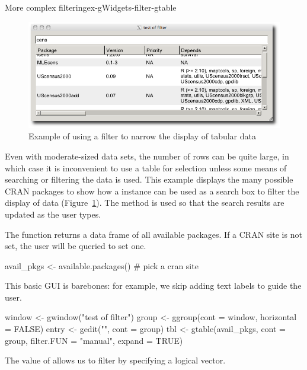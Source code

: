 \begin{example}{More complex filtering}{ex-gWidgets-filter-gtable}
%
\begin{figure}
  \centering
  \includegraphics[width=.8\textwidth]{fig-gWidgets-filter-example}
  \caption{Example of using a filter to narrow the display of tabular data}
  \label{fig:gWidgets-filter-example}
\end{figure}
%
Even with moderate-sized data sets, the number of rows can be quite large, in which case it is
inconvenient to use a table for selection unless some means of searching or filtering the
data is used. This example displays the many possible CRAN packages to show how a
 instance can be used as a search box to filter the display of
data (Figure~\ref{fig:gWidgets-filter-example}). The  method is used so that the search
results are updated as the user types.


The  function returns a data frame of all
available packages. If a CRAN site is not set, the user will be
queried to set one.
\begin{Schunk}
\begin{Sinput}
 avail_pkgs <- available.packages()       # pick a cran site
\end{Sinput}
\end{Schunk}

This basic GUI is barebones: for example, we skip adding text labels to guide the user. 
\begin{Schunk}
\begin{Sinput}
 window <- gwindow("test of filter")
 group <- ggroup(cont = window, horizontal = FALSE)
 entry <- gedit("", cont = group)
 tbl <- gtable(avail_pkgs, cont = group, filter.FUN = "manual",
               expand = TRUE)
\end{Sinput}
\end{Schunk}
The  value of  allows us to
filter by specifying a logical vector.


\end{example}
